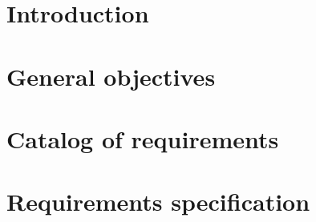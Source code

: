
\section{Introduction}

\section{General objectives}

\section{Catalog of requirements}

\section{Requirements specification}


